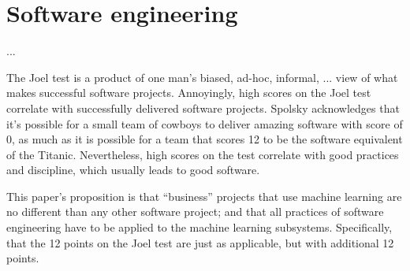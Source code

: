 \documentclass[10 pt, twocolumn]{article}
\begin{document}
\section{Software engineering}
...

The Joel test\cite{joeltest} is a product of one man's biased, ad-hoc, informal, ... view of what makes successful software projects. Annoyingly, high scores on the Joel test correlate with successfully delivered software projects. Spolsky acknowledges that it's possible for a small team of cowboys to deliver amazing software with score of 0, as much as it is possible for a team that scores 12 to be the software equivalent of the Titanic. Nevertheless, high scores on the test correlate with good practices and discipline, which usually leads to good software.

This paper's proposition is that ``business'' projects that use machine learning are no different than any other software project; and that all practices of software engineering have to be applied to the machine learning subsystems. Specifically, that the 12 points on the Joel test are just as applicable, but with additional 12 points. 
\end{document}
